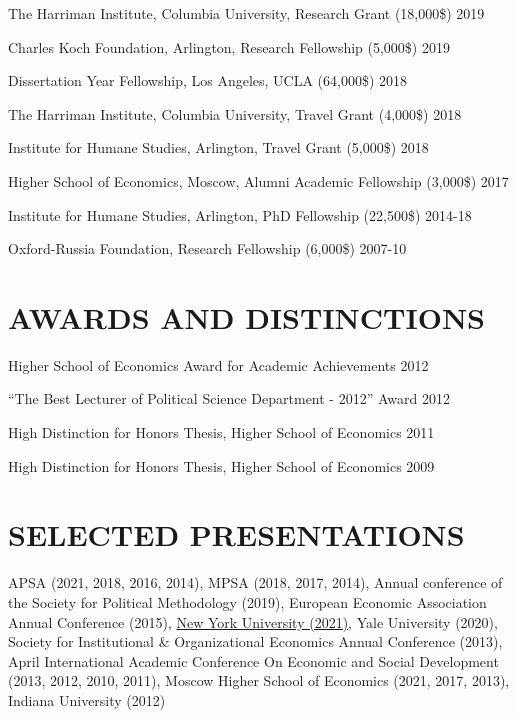 \documentclass[11pt,]{article}
\begin{document}
The Harriman Institute, Columbia University, Research Grant (18,000\$)
\hfill 2019

Charles Koch Foundation, Arlington, Research Fellowship (5,000\$)
\hfill 2019

Dissertation Year Fellowship, Los Angeles, UCLA (64,000\$) \hfill 2018

The Harriman Institute, Columbia University, Travel Grant (4,000\$)
\hfill 2018

Institute for Humane Studies, Arlington, Travel Grant (5,000\$)
\hfill 2018

Higher School of Economics, Moscow, Alumni Academic Fellowship (3,000\$)
\hfill 2017

Institute for Humane Studies, Arlington, PhD Fellowship (22,500\$)
\hfill 2014-18

Oxford-Russia Foundation, Research Fellowship (6,000\$) \hfill  2007-10

\hypertarget{awards-and-distinctions}{%
\section{AWARDS AND DISTINCTIONS}\label{awards-and-distinctions}}

Higher School of Economics Award for Academic Achievements \hfill 2012

``The Best Lecturer of Political Science Department - 2012'' Award
\hfill 2012

High Distinction for Honors Thesis, Higher School of Economics
\hfill  2011

High Distinction for Honors Thesis, Higher School of Economics
\hfill  2009

\hypertarget{selected-presentations}{%
\section{SELECTED PRESENTATIONS}\label{selected-presentations}}

APSA (2021, 2018, 2016, 2014), MPSA (2018, 2017, 2014), Annual
conference of the Society for Political Methodology (2019), European
Economic Association Annual Conference (2015),
\href{https://www.youtube.com/watch?v=6_3E39SH688}{New York University
(2021)}, Yale University (2020), Society for Institutional \&
Organizational Economics Annual Conference (2013), April International
Academic Conference On Economic and Social Development (2013, 2012,
2010, 2011), Moscow Higher School of Economics (2021, 2017, 2013),
Indiana University (2012)
\end{document}
